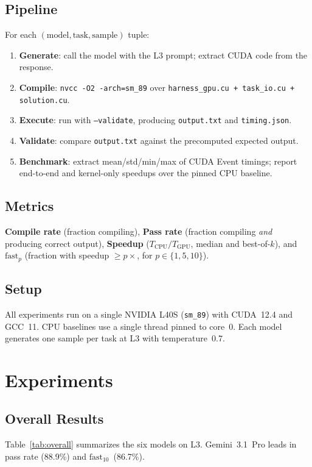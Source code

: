 \documentclass{article}
\begin{document}
\subsection{Pipeline}
For each \((\text{model}, \text{task}, \text{sample})\) tuple:
\begin{enumerate}
  \item \textbf{Generate}: call the model with the L3 prompt; extract CUDA code from the response.
  \item \textbf{Compile}: \texttt{nvcc -O2 -arch=sm\_89} over \texttt{harness\_gpu.cu + task\_io.cu + solution.cu}.
  \item \textbf{Execute}: run with \texttt{--validate}, producing \texttt{output.txt} and \texttt{timing.json}.
  \item \textbf{Validate}: compare \texttt{output.txt} against the precomputed expected output.
  \item \textbf{Benchmark}: extract mean/std/min/max of CUDA Event timings; report end-to-end and kernel-only speedups over the pinned CPU baseline.
\end{enumerate}

\subsection{Metrics}
\textbf{Compile rate} (fraction compiling), \textbf{Pass rate} (fraction compiling \emph{and} producing correct output), \textbf{Speedup} ($T_{\mathrm{CPU}} / T_{\mathrm{GPU}}$, median and best-of-$k$), and \textbf{$\mathrm{fast}_p$} (fraction with speedup $\geq p\times$, for $p \in \{1, 5, 10\}$).

\subsection{Setup}
All experiments run on a single NVIDIA L40S (\texttt{sm\_89}) with CUDA~12.4 and GCC~11. CPU baselines use a single thread pinned to core~0. Each model generates one sample per task at L3 with temperature~0.7.

\section{Experiments}
\label{sec:results}

\subsection{Overall Results}

Table~\ref{tab:overall} summarizes the six models on L3. Gemini~3.1~Pro leads in pass rate (88.9\%) and $\mathrm{fast}_{10}$~(86.7\%).
\end{document}
